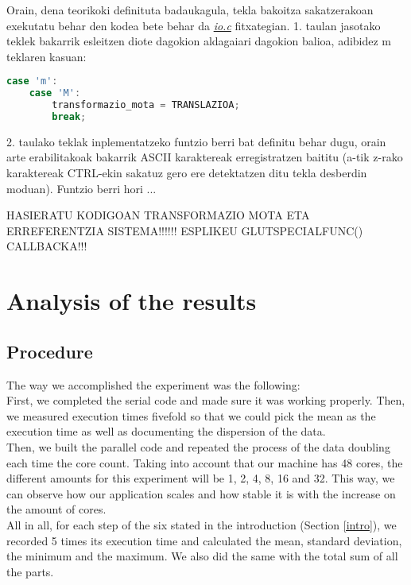 \documentclass[12pt]{article}
\newcommand{\fitxategi}[1] {\underline{\textit{#1}}}
\begin{document}
Orain, dena teorikoki definituta badaukagula, tekla bakoitza sakatzerakoan exekutatu behar den kodea bete behar da \fitxategi{io.c} fitxategian. 1. taulan jasotako teklek bakarrik esleitzen diote dagokion aldagaiari dagokion balioa, adibidez m teklaren kasuan:

\begin{center}
	\begin{lstlisting}[language=C, basicstyle=\footnotesize]
	case 'm':
	case 'M':
		transformazio_mota = TRANSLAZIOA;
		break;
	\end{lstlisting}
\end{center}


2. taulako teklak inplementatzeko funtzio berri bat definitu behar dugu, orain arte erabilitakoak bakarrik ASCII karaktereak erregistratzen baititu (a-tik z-rako karaktereak CTRL-ekin sakatuz gero ere detektatzen ditu tekla desberdin moduan). Funtzio berri hori ...

HASIERATU KODIGOAN TRANSFORMAZIO MOTA ETA ERREFERENTZIA SISTEMA!!!!!!
ESPLIKEU GLUTSPECIALFUNC() CALLBACKA!!!




\section{Analysis of the results}

\subsection{Procedure}\label{procedure}

The way we accomplished the experiment was the following:\\

First, we completed the serial code and made sure it was working properly. Then, we measured execution times fivefold so that we could pick the mean as the execution time as well as documenting the dispersion of the data.\\
Then, we built the parallel code and repeated the process of the data doubling each time the core count. Taking into account that our machine has 48 cores, the different amounts for this experiment will be 1, 2, 4, 8, 16 and 32. This way, we can observe how our application scales and how stable it is with the increase on the amount of cores.\\

All in all, for each step of the six stated in the introduction (Section \ref{intro}), we recorded 5 times its execution time and calculated the mean, standard deviation, the minimum and the maximum. We also did the same with the total sum of all the parts.
\end{document}
